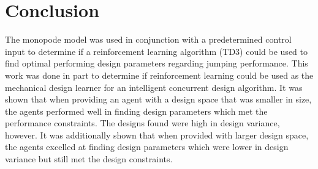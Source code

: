 \documentclass[10pt,twocolumn,letterpaper]{article}
\begin{document}
\section{Conclusion}
\label{sec:conclusion}
The monopode model was used in conjunction with a predetermined control input to determine if a reinforcement learning algorithm (TD3) could be used to find optimal performing design parameters regarding jumping performance. This work was done in part to determine if reinforcement learning could be used as the mechanical design learner for an intelligent concurrent design algorithm. It was shown that when providing an agent with a design space that was smaller in size, the agents performed well in finding design parameters which met the performance constraints. The designs found were high in design variance, however. It was additionally shown that when provided with larger design space, the agents excelled at finding design parameters which were lower in design variance but still met the design constraints.


{\small


}
\end{document}
